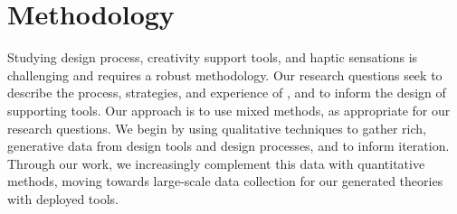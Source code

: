 %
%





%
%
\section{Methodology}

Studying design process, creativity support tools, and haptic sensations is challenging and requires a robust methodology.
Our research questions seek to describe the process, strategies, and experience of \haxd, and to inform the design of supporting tools.
Our approach is to use mixed methods, as appropriate for our research questions.
We begin by using qualitative techniques to gather rich, generative data from design tools and design processes, and to inform iteration.
Through our work, we increasingly complement this data with quantitative methods, moving towards large-scale data collection for our generated theories with deployed tools.


